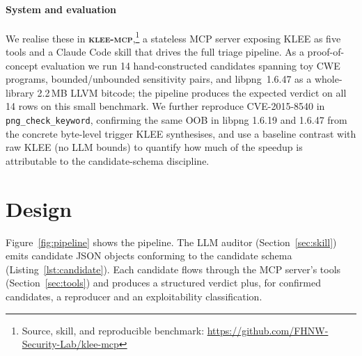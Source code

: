 \documentclass[3p,times,procedia]{elsarticle}
\begin{document}
\paragraph{System and evaluation} We realise these in \textbf{\textsc{klee-mcp}},\footnote{Source, skill, and reproducible benchmark: \url{https://github.com/FHNW-Security-Lab/klee-mcp}} a stateless MCP server exposing KLEE as five tools and a Claude Code skill that drives the full triage pipeline. As a proof-of-concept evaluation we run 14 hand-constructed candidates spanning toy CWE programs, bounded/unbounded sensitivity pairs, and libpng~1.6.47 as a whole-library 2.2\,MB LLVM bitcode; the pipeline produces the expected verdict on all 14 rows on this small benchmark. We further reproduce CVE-2015-8540 in \texttt{png\_check\_keyword}, confirming the same OOB in libpng 1.6.19 and 1.6.47 from the concrete byte-level trigger KLEE synthesises, and use a baseline contrast with raw KLEE (no LLM bounds) to quantify how much of the speedup is attributable to the candidate-schema discipline.

\section{Design}
\label{sec:design}

Figure~\ref{fig:pipeline} shows the pipeline. The LLM auditor (Section~\ref{sec:skill}) emits candidate JSON objects conforming to the candidate schema (Listing~\ref{lst:candidate}). Each candidate flows through the MCP server's tools (Section~\ref{sec:tools}) and produces a structured verdict plus, for confirmed candidates, a reproducer and an exploitability classification.
\end{document}
